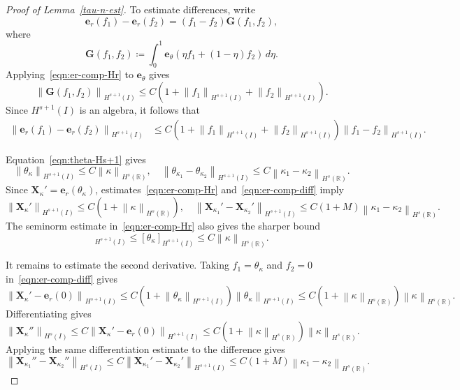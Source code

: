 \documentclass[11pt,reqno]{amsart}
\theoremstyle{plain}
\theoremstyle{definition}
\numberwithin{equation}{section}
\newcommand{\paren}[1]{\left(#1\right)}
\newcommand{\bm}[1]{\boldsymbol{#1}}
\newcommand{\norm}[1]{\left\lVert #1 \right\rVert}
\newcommand{\R}{\mathbb{R}}
\newcommand{\thk}{\theta_\kappa}
\newcommand{\xk}{\bm X_\kappa}
\newcommand{\thka}[1]{\theta_{\kappa_{#1}}}
\newcommand{\xka}[1]{\bm X_{\kappa_{#1}}}
\newcommand{\hi}[1]{H^{#1}(I)}
\newcommand{\hr}[1]{H^{#1}(\R)}
\begin{document}
\begin{proof}[Proof of Lemma~\ref{tau-n-est}]
To estimate differences, write
\begin{equation}
    \bm e_r(f_1)-\bm e_r(f_2)
    = \paren{f_1-f_2}\bm G(f_1,f_2),
\end{equation}
where
\begin{equation}
    \bm G(f_1,f_2)
    \coloneqq \int_0^1 \bm e_\theta\paren{\eta f_1+(1-\eta)f_2}\,d\eta.
\end{equation}
Applying~\eqref{eqn:er-comp-Hr} to $\bm e_\theta$ gives
\begin{equation}
    \norm{\bm G(f_1,f_2)}_{\hi{s+1}}
    \le C\paren{1+\norm{f_1}_{\hi{s+1}}+\norm{f_2}_{\hi{s+1}}}.
\end{equation}
Since $H^{s+1}(I)$ is an algebra, it follows that
\begin{equation}\label{eqn:er-comp-diff}
\begin{aligned}
    \norm{\bm e_r(f_1)-\bm e_r(f_2)}_{\hi{s+1}}
    &\le C\paren{1+\norm{f_1}_{\hi{s+1}}+\norm{f_2}_{\hi{s+1}}}
    \norm{f_1-f_2}_{\hi{s+1}}.
\end{aligned}
\end{equation}

Equation~\eqref{eqn:theta-Hs+1} gives
\begin{equation}
    \norm{\thk}_{\hi{s+1}} \le C\norm{\kappa}_{\hr{s}},
    \quad
    \norm{\thka{1}-\thka{2}}_{\hi{s+1}}
    \le C\norm{\kappa_1-\kappa_2}_{\hr{s}}.
\end{equation}
Since $\xk'=\bm e_r(\thk)$, estimates~\eqref{eqn:er-comp-Hr}
and~\eqref{eqn:er-comp-diff} imply
\begin{equation}
    \norm{\xk'}_{\hi{s+1}}
    \le C\paren{1+\norm{\kappa}_{\hr{s}}},
    \quad
    \norm{\xka{1}'-\xka{2}'}_{\hi{s+1}}
    \le C\paren{1+M}\norm{\kappa_1-\kappa_2}_{\hr{s}}.
\end{equation}
The seminorm estimate in~\eqref{eqn:er-comp-Hr} also gives the sharper bound
\begin{equation}
    [\xk']_{\hi{s+1}}
    \le [\thk]_{\hi{s+1}}
    \le C\norm{\kappa}_{\hr{s}}.
\end{equation}

It remains to estimate the second derivative. Taking $f_1=\thk$ and $f_2=0$
in~\eqref{eqn:er-comp-diff} gives
\begin{equation}
    \norm{\xk'-\bm e_r(0)}_{\hi{s+1}}
    \le C\paren{1+\norm{\thk}_{\hi{s+1}}}\norm{\thk}_{\hi{s+1}}
    \le C\paren{1+\norm{\kappa}_{\hr{s}}}\norm{\kappa}_{\hr{s}}.
\end{equation}
Differentiating gives
\begin{equation}
    \norm{\xk''}_{\hi{s}}
    \le C \norm{\xk'-\bm e_r(0)}_{\hi{s+1}}
    \le C\paren{1+\norm{\kappa}_{\hr{s}}}\norm{\kappa}_{\hr{s}}.
\end{equation}
Applying the same differentiation estimate to the difference gives
\begin{equation}
    \norm{\xka{1}''-\xka{2}''}_{\hi{s}}
    \le C \norm{\xka{1}'-\xka{2}'}_{\hi{s+1}}
    \le C\paren{1+M}\norm{\kappa_1-\kappa_2}_{\hr{s}}.
\end{equation}
\end{proof}
\end{document}
